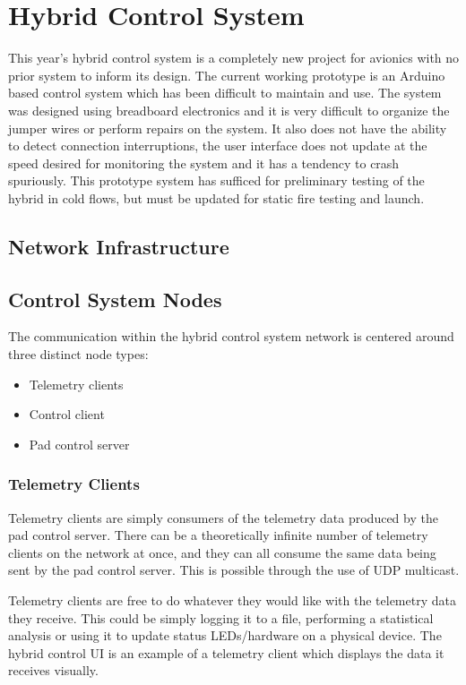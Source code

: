 \section{Hybrid Control System}

This year's hybrid control system is a completely new project for avionics with no prior system to inform its design.
The current working prototype is an Arduino based control system which has been difficult to maintain and use. The
system was designed using breadboard electronics and it is very difficult to organize the jumper wires or perform
repairs on the system. It also does not have the ability to detect connection interruptions, the user interface does not
update at the speed desired for monitoring the system and it has a tendency to crash spuriously. This prototype system
has sufficed for preliminary testing of the hybrid in cold flows, but must be updated for static fire testing and
launch.

\subsection{Network Infrastructure}

\subsection{Control System Nodes}

The communication within the hybrid control system network is centered around three distinct node types:

\begin{itemize}
    \item Telemetry clients
    \item Control client
    \item Pad control server
\end{itemize}

\subsubsection{Telemetry Clients}

Telemetry clients are simply consumers of the telemetry data produced by the pad control server. There can be a
theoretically infinite number of telemetry clients on the network at once, and they can all consume the same data being
sent by the pad control server. This is possible through the use of UDP multicast.

Telemetry clients are free to do whatever they would like with the telemetry data they receive. This could be simply
logging it to a file, performing a statistical analysis or using it to update status LEDs/hardware on a physical device.
The hybrid control UI is an example of a telemetry client which displays the data it receives visually.

